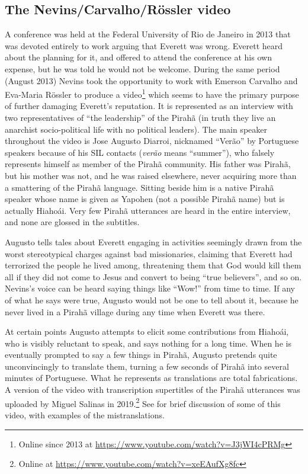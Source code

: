 \documentclass[output=paper,colorlinks,citecolor=brown
]{langscibook}
\begin{document}
\subsection{The Nevins/Carvalho/R{\"o}ssler video}

A conference was held at the Federal University of Rio de Janeiro in
2013 that was devoted entirely to work arguing that Everett was wrong.
Everett heard about the planning for it, and offered to attend the
conference at his own expense, but he was told he would not be welcome.
During the same period (August 2013) Nevins took the opportunity to
work with Emerson Carvalho and Eva-Maria R{\"o}ssler to produce a
video\footnote{\label{augustovideo}%
   Online since 2013 at
   \url{https://www.youtube.com/watch?v=J3jWI4cPRMg}}
which seems to have the primary purpose of further damaging Everett's
reputation. It is represented as an interview with two representatives
of ``the leadership'' of the Pirah{\~a} (in truth they live an
anarchist socio-political life with no political leaders). The main
speaker throughout the video is Jose Augusto Diarroi, nicknamed
``Ver{\~a}o'' by Portuguese speakers because of his SIL contacts
(\textit{ver{\~a}o} means ``summer''), who falsely represents himself
as member of the Pirah{\~a} community. His father was Pirah{\~a}, but
his mother was not, and he was raised elsewhere, never acquiring more
than a smattering of the Pirah{\~a} language. Sitting beside him is
a native Pirah{\~a} speaker whose name is given as Yapohen (not a
possible Pirah{\~a} name) but is actually Hiaho{\'a}i. Very few
Pirah{\~a} utterances are heard in the entire interview, and none are
glossed in the subtitles.

Augusto tells tales about Everett engaging in activities seemingly
drawn from the worst stereotypical charges against bad missionaries,
claiming that Everett had terrorized the people he lived among,
threatening them that God would kill them all if they did not come
to Jesus and convert to being ``true believers'', and so on. Nevins's
voice can be heard saying things like ``Wow!'' from time to time.
If any of what he says were true, Augusto would not be one to tell
about it, because he never lived in a Pirah{\~a} village during any
time when Everett was there.

At certain points Augusto attempts to elicit some contributions from
Hiaho{\'a}i, who is visibly reluctant to speak, and says nothing for
a long time. When he is eventually prompted to say a few things in
Pirah{\~a}, Augusto pretends quite unconvincingly to translate them,
turning a few seconds of Pirah{\~a} into several minutes of Portuguese.
What he represents as translations are total fabrications. A version
of the video with transcription supertitles of the Pirah{\~a} utterances
was uploaded by Miguel Salinas in 2019.\footnote{\label{salinasvideo}%
   Online at \url{https://www.youtube.com/watch?v=xeEAufXg8fc}}
See \citet[781, fn.\,3]{EverGibs19} for brief
discussion of some of this video, with examples of the mistranslations.
\end{document}
